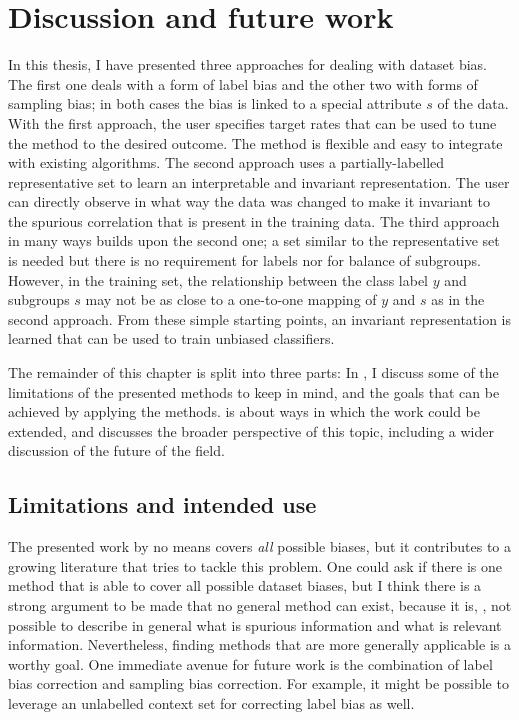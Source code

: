 \chapter{Discussion and future work}\label{ch:conclusion}
In this thesis, I have presented three approaches for dealing with dataset bias.
The first one deals with a form of label bias and the other two with forms of sampling bias;
in both cases the bias is linked to a special attribute \(s\) of the data.
%
%
With the first approach, the user specifies target rates that can be used to tune the method to the desired outcome.
The method is flexible and easy to integrate with existing algorithms.
The second approach uses a partially-labelled representative set to learn an interpretable and invariant representation.
The user can directly observe in what way the data was changed to make it invariant
to the spurious correlation that is present in the training data.
The third approach in many ways builds upon the second one;
a set similar to the representative set is needed but there is no requirement for labels nor for balance of subgroups.
However, in the training set, the relationship between the class label \(y\) and subgroups \(s\) may not be
as close to a one-to-one mapping of \(y\) and \(s\) as in the second approach.
From these simple starting points, an invariant representation is learned
that can be used to train unbiased classifiers.

The remainder of this chapter is split into three parts:
In ,
I discuss some of the limitations of the presented methods to keep in mind,
and the goals that can be achieved by applying the methods.
 is about ways in which the work could be extended,
and  discusses the broader perspective of this topic,
including a wider discussion of the future of the field.

\section{Limitations and intended use}\label{sec:ch7-limitations}
%
The presented work by no means covers \emph{all} possible biases,
but it contributes to a growing literature that tries to tackle this problem.
One could ask if there is one method that is able to cover all possible dataset biases,
but I think there is a strong argument to be made that no general method can exist,
because it is, \eg, not possible to describe in general what is spurious information and what is relevant information.
Nevertheless, finding methods that are more generally applicable is a worthy goal.
One immediate avenue for future work is
the combination of label bias correction and sampling bias correction.
For example, it might be possible to leverage an unlabelled context set for correcting label bias as well.

